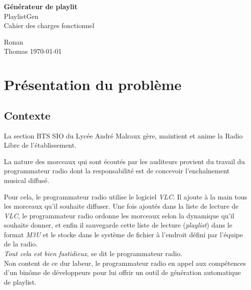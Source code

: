 \documentclass[a4paper,titlepage,oneside]{article}
\begin{document}
\pagestyle{empty}

\begin{center}
\vspace{3.5cm}
\Huge{\textbf{Générateur de playlit}}\\
\Huge{PlaylistGen}\\
\vspace{1cm}
\huge{Cahier des charges fonctionnel}
\vfill
\end{center}
\begin{flushleft}
Ronan \\
Thomas 
\hfill
\today
\end{flushleft}
\newpage

\newpage
\pagestyle{fancy}
\setcounter{page}{1}
\tableofcontents{}
\newpage


\section{Présentation du problème}
\subsection{Contexte}
La section BTS SIO du Lycée André Malraux gère, maintient et anime la
Radio Libre de l’établissement.

La nature des morceaux qui sont écoutés par les auditeurs provient du travail
du programmateur radio dont la responsabilité est de concevoir l’enchaînement
musical diffusé.

Pour cela, le programmateur radio utilise le logiciel \textit{VLC}. Il ajoute à la main tous les morceaux qu’il souhaite diffuser. Une fois ajoutés dans la liste de lecture de \textit{VLC}, le programmateur radio ordonne les morceaux selon la dynamique qu’il souhaite donner, et enfin il sauvegarde cette liste de lecture (\textit{playlist}) dans le format \textit{M3U} et le stocke dans le système de fichier à l’endroit défini par l’équipe de la radio.\\

\textit{Tout cela est bien fastidieux}, se dit le programmateur radio.\\

Non content de ce dur labeur, le programmateur radio en appel aux compétences d’un binôme de développeurs pour lui offrir un outil de génération automatique de playlist.
\end{document}
